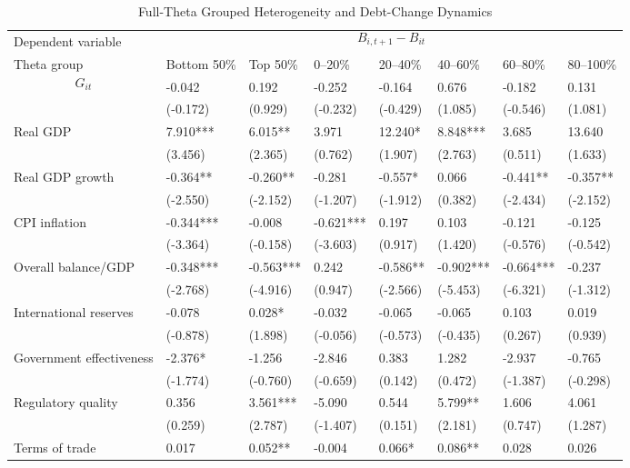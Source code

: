 \begin{table}[H]\centering
\begin{threeparttable}
\caption{Full-Theta Grouped Heterogeneity and Debt-Change Dynamics}
\label{tab:theta_group_heterogeneity_debt}
\scriptsize
\begin{tabularx}{\textwidth}{lYYYYYYY}
\toprule
Dependent variable &  \\
\cmidrule(lr){2-8}
Theta group & Bottom 50\% & Top 50\% & 0--20\% & 20--40\% & 40--60\% & 60--80\% & 80--100\% \\
\midrule
$$G_{it}$$ & -0.042 & 0.192 & -0.252 & -0.164 & 0.676 & -0.182 & 0.131 \\
  & (-0.172) & (0.929) & (-0.232) & (-0.429) & (1.085) & (-0.546) & (1.081) \\
Real GDP & 7.910*** & 6.015** & 3.971 & 12.240* & 8.848*** & 3.685 & 13.640 \\
  & (3.456) & (2.365) & (0.762) & (1.907) & (2.763) & (0.511) & (1.633) \\
Real GDP growth & -0.364** & -0.260** & -0.281 & -0.557* & 0.066 & -0.441** & -0.357** \\
  & (-2.550) & (-2.152) & (-1.207) & (-1.912) & (0.382) & (-2.434) & (-2.152) \\
CPI inflation & -0.344*** & -0.008 & -0.621*** & 0.197 & 0.103 & -0.121 & -0.125 \\
  & (-3.364) & (-0.158) & (-3.603) & (0.917) & (1.420) & (-0.576) & (-0.542) \\
Overall balance/GDP & -0.348*** & -0.563*** & 0.242 & -0.586** & -0.902*** & -0.664*** & -0.237 \\
  & (-2.768) & (-4.916) & (0.947) & (-2.566) & (-5.453) & (-6.321) & (-1.312) \\
International reserves & -0.078 & 0.028* & -0.032 & -0.065 & -0.065 & 0.103 & 0.019 \\
  & (-0.878) & (1.898) & (-0.056) & (-0.573) & (-0.435) & (0.267) & (0.939) \\
Government effectiveness & -2.376* & -1.256 & -2.846 & 0.383 & 1.282 & -2.937 & -0.765 \\
  & (-1.774) & (-0.760) & (-0.659) & (0.142) & (0.472) & (-1.387) & (-0.298) \\
Regulatory quality & 0.356 & 3.561*** & -5.090 & 0.544 & 5.799** & 1.606 & 4.061 \\
  & (0.259) & (2.787) & (-1.407) & (0.151) & (2.181) & (0.747) & (1.287) \\
Terms of trade & 0.017 & 0.052** & -0.004 & 0.066* & 0.086** & 0.028 & 0.026 \\

\end{tabularx}
\end{threeparttable}
\end{table}
